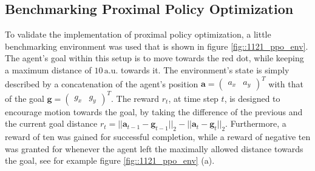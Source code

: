 \subsection{Benchmarking Proximal Policy Optimization}
\label{sec::1121_bpp}
To validate the implementation of proximal policy optimization, a little benchmarking environment was used that is shown in figure \ref{fig::1121_ppo_env}. The agent's goal within this setup is to move towards the red dot, while keeping a maximum distance of $10\,\text{a.u.}$ towards it. The environment's state is simply described by a concatenation of the agent's position $\bm{a} = \begin{pmatrix}
a_x & a_y
\end{pmatrix}^T$ with that of the goal $\bm{g} = \begin{pmatrix}
g_x & g_y
\end{pmatrix}^T$. The reward $r_t$, at time step $t$, is designed to encourage motion towards the goal, by taking the difference of the previous and the current goal distance $r_t = ||\bm{a}_{t-1}-\bm{g}_{t-1}||_2 - ||\bm{a}_{t}-\bm{g}_{t}||_2$. Furthermore, a reward of ten was gained for successful completion, while a reward of negative ten was granted for whenever the agent left the maximally allowed distance towards the goal, see for example figure \ref{fig::1121_ppo_env} (a).
